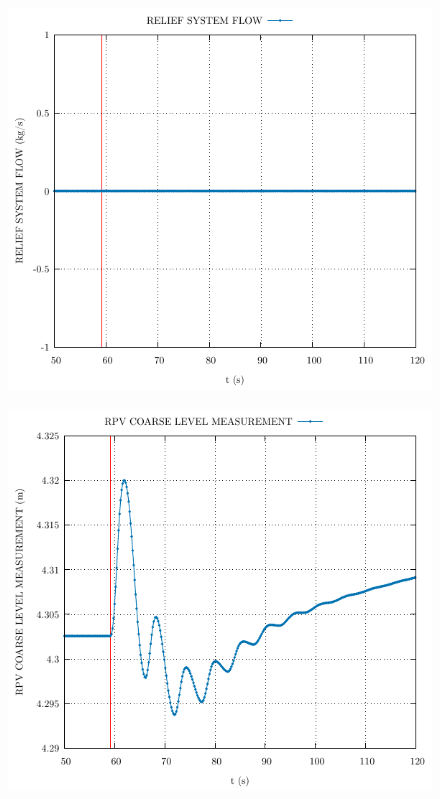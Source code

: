 \documentclass{article}
\begin{document}
\begin{multicols}{2}
\begin{figure}[H]
\end{figure}
\begin{figure}[H]
\centering
\includegraphics[width=\linewidth]{./graphs/RELIEF SYSTEM FLOW_comp.pdf}
\end{figure}
\begin{figure}[H]
\centering
\includegraphics[width=\linewidth]{./graphs/RPV COARSE LEVEL MEASUREMENT_comp.pdf}

\end{figure}
\end{multicols}
\end{document}

